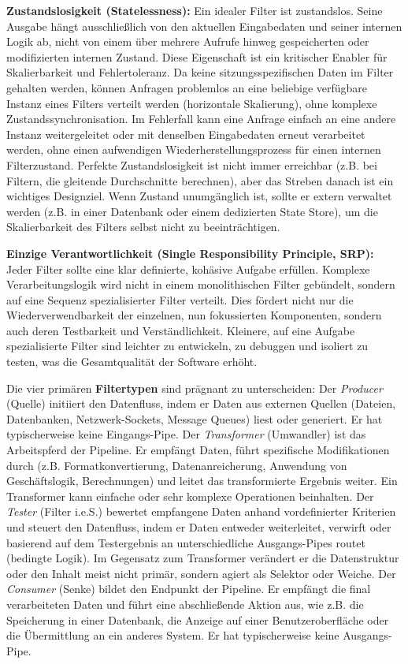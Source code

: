 \documentclass[10pt]{article}
\begin{document}
\begin{multicols}{2}
\textbf{Zustandslosigkeit (Statelessness):} Ein idealer Filter ist zustandslos. Seine Ausgabe hängt ausschließlich von den aktuellen Eingabedaten und seiner internen Logik ab, nicht von einem über mehrere Aufrufe hinweg gespeicherten oder modifizierten internen Zustand.\cite{richards2020} Diese Eigenschaft ist ein kritischer Enabler für Skalierbarkeit und Fehlertoleranz. Da keine sitzungsspezifischen Daten im Filter gehalten werden, können Anfragen problemlos an eine beliebige verfügbare Instanz eines Filters verteilt werden (horizontale Skalierung), ohne komplexe Zustandssynchronisation. Im Fehlerfall kann eine Anfrage einfach an eine andere Instanz weitergeleitet oder mit denselben Eingabedaten erneut verarbeitet werden, ohne einen aufwendigen Wiederherstellungsprozess für einen internen Filterzustand. Perfekte Zustandslosigkeit ist nicht immer erreichbar (z.B. bei Filtern, die gleitende Durchschnitte berechnen), aber das Streben danach ist ein wichtiges Designziel. Wenn Zustand unumgänglich ist, sollte er extern verwaltet werden (z.B. in einer Datenbank oder einem dedizierten State Store), um die Skalierbarkeit des Filters selbst nicht zu beeinträchtigen.\cite{researchgate_parallel_pipes}

\textbf{Einzige Verantwortlichkeit (Single Responsibility Principle, SRP):} Jeder Filter sollte eine klar definierte, kohäsive Aufgabe erfüllen.\cite{richards2020} Komplexe Verarbeitungslogik wird nicht in einem monolithischen Filter gebündelt, sondern auf eine Sequenz spezialisierter Filter verteilt. Dies fördert nicht nur die Wiederverwendbarkeit der einzelnen, nun fokussierten Komponenten, sondern auch deren Testbarkeit und Verständlichkeit. Kleinere, auf eine Aufgabe spezialisierte Filter sind leichter zu entwickeln, zu debuggen und isoliert zu testen, was die Gesamtqualität der Software erhöht.

Die vier primären \textbf{Filtertypen} sind prägnant zu unterscheiden:\cite{uqcloud_pipeline, richards2020}
Der \textit{Producer} (Quelle) initiiert den Datenfluss, indem er Daten aus externen Quellen (Dateien, Datenbanken, Netzwerk-Sockets, Message Queues) liest oder generiert. Er hat typischerweise keine Eingangs-Pipe.
Der \textit{Transformer} (Umwandler) ist das Arbeitspferd der Pipeline. Er empfängt Daten, führt spezifische Modifikationen durch (z.B. Formatkonvertierung, Datenanreicherung, Anwendung von Geschäftslogik, Berechnungen) und leitet das transformierte Ergebnis weiter. Ein Transformer kann einfache oder sehr komplexe Operationen beinhalten.
Der \textit{Tester} (Filter i.e.S.) bewertet empfangene Daten anhand vordefinierter Kriterien und steuert den Datenfluss, indem er Daten entweder weiterleitet, verwirft oder basierend auf dem Testergebnis an unterschiedliche Ausgangs-Pipes routet (bedingte Logik). Im Gegensatz zum Transformer verändert er die Datenstruktur oder den Inhalt meist nicht primär, sondern agiert als Selektor oder Weiche.
Der \textit{Consumer} (Senke) bildet den Endpunkt der Pipeline. Er empfängt die final verarbeiteten Daten und führt eine abschließende Aktion aus, wie z.B. die Speicherung in einer Datenbank, die Anzeige auf einer Benutzeroberfläche oder die Übermittlung an ein anderes System. Er hat typischerweise keine Ausgangs-Pipe.


\end{multicols}
\end{document}
